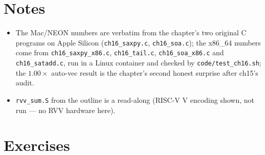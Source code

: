\section*{Notes}
\begin{itemize}
\item The Mac/NEON numbers are verbatim from the chapter's two original C programs on
      Apple Silicon (\texttt{ch16\_saxpy.c}, \texttt{ch16\_soa.c});
      the x86\_64 numbers come from \texttt{ch16\_saxpy\_x86.c},
      \texttt{ch16\_tail.c}, \texttt{ch16\_soa\_x86.c} and
      \texttt{ch16\_satadd.c}, run in a Linux container and checked by
      \texttt{code/test\_ch16.sh}; the $1.00\times$ auto-vec result is the
      chapter's second honest surprise after ch15's audit.
\item \texttt{rvv\_sum.S} from the outline is a read-along
      (RISC-V V encoding shown, not run --- no RVV hardware here).
\end{itemize}

\section*{Exercises}

